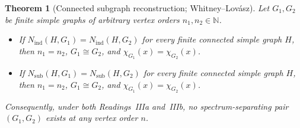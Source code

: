 \documentclass[11pt]{article}
\newtheorem{theorem}{Theorem}[section]
\theoremstyle{definition}
\newcommand{\Nind}{N_{\mathrm{ind}}}
\newcommand{\Nsub}{N_{\mathrm{sub}}}
\begin{document}
\begin{theorem}[Connected subgraph reconstruction; Whitney--Lov\'asz]
\label{thm:reading-III}
Let $G_1, G_2$ be finite simple graphs of arbitrary vertex orders $n_1, n_2 \in \mathbb{N}$.
\begin{itemize}
  \item[(a)] If $\Nind(H, G_1) = \Nind(H, G_2)$ for every finite connected simple graph $H$, then $n_1 = n_2$, $G_1 \cong G_2$, and $\chi_{G_1}(x) = \chi_{G_2}(x)$.
  \item[(b)] If $\Nsub(H, G_1) = \Nsub(H, G_2)$ for every finite connected simple graph $H$, then $n_1 = n_2$, $G_1 \cong G_2$, and $\chi_{G_1}(x) = \chi_{G_2}(x)$.
\end{itemize}
Consequently, under both Readings~IIIa and~IIIb, no spectrum-separating pair $(G_1, G_2)$ exists at any vertex order $n$.
\end{theorem}
\end{document}
